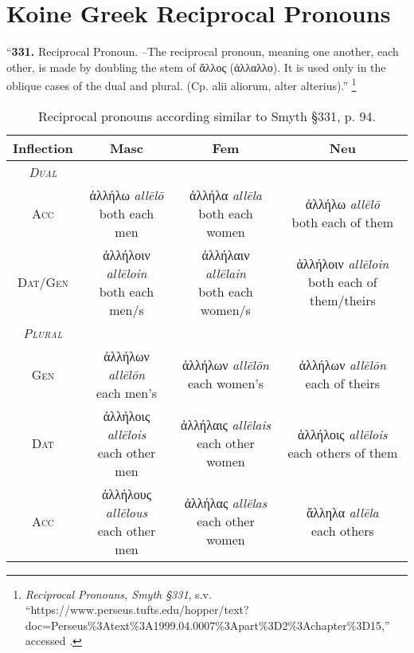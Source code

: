 \documentclass[10pt]{memoir}
\newcommand{\tsc}[1]{\textsc{#1}}
\newcommand{\grc}[1]{\fontspec{Inter}#1}
\newcommand{\trc}[1]{\textit{\fontspec{Tinos}#1}}
\newcommand{\linkfoot}[3]{\footnote{\emph{#1}, s.v. ``{#2},'' accessed \printdate{#3}.}}
\begin{document}
    \section*{Koine Greek Reciprocal Pronouns}

    ``\textbf{331.} Reciprocal Pronoun. --The reciprocal pronoun, meaning one another, each other, is made
    by doubling the stem of \grc{ἄλλος} (\grc{ἀλλαλλο}). \fontspec{} It is used only in the oblique cases of
    the dual and plural. (Cp. alii aliorum, alter alterius).''
    \linkfoot{Reciprocal Pronouns, Smyth §331}{https://www.perseus.tufts.edu/hopper/text?doc=Perseus\%3Atext\%3A1999.04.0007\%3Apart\%3D2\%3Achapter\%3D15}{2025-05-23}

    \begin{table}[H]
        \begin{tabular}{c|ccc}
            \textbf{Inflection} & \textbf{Masc} & \textbf{Fem} & \textbf{Neu} \\
            \hline
            \emph{\tsc{Dual}} \\
            \tsc{Acc} & \makecell{\grc{ἀλλήλω} \trc{allēlō} \\ \small both each men} & \makecell{\grc{ἀλλήλα} \trc{allēla} \\ \small both each women} & \makecell{\grc{ἀλλήλω} \trc{allēlō} \\ \small both each of them} \\
            \tsc{Dat/Gen} & \makecell{\grc{ἀλλήλοιν} \trc{allēloin} \\ \small both each men/s} & \makecell{\grc{ἀλλήλαιν} \trc{allēlain} \\ \small both each women/s} & \makecell{\grc{ἀλλήλοιν} \trc{allēloin} \\ \small both each of them/theirs} \\
            \hline
            \emph{\tsc{Plural}} \\
            \tsc{Gen} & \makecell{\grc{ἀλλήλων} \trc{allēlōn} \\ \small each men's} & \makecell{\grc{ἀλλήλων} \trc{allēlōn} \\ \small each women's} & \makecell{\grc{ἀλλήλων} \trc{allēlōn} \\ \small each of theirs} \\
            \tsc{Dat} & \makecell{\grc{ἀλλήλοις} \trc{allēlois} \\ \small each other men} & \makecell{\grc{ἀλλήλαις} \trc{allēlais}\\ \small each other women} & \makecell{\grc{ἀλλήλοις} \trc{allēlois} \\ \small each others of them } \\
            \tsc{Acc} & \makecell{\grc{ἀλλήλους} \trc{allēlous} \\ \small each other men} & \makecell{\grc{ἀλλήλας} \trc{allēlas} \\ \small each other women} & \makecell{\grc{ἄλληλα} \trc{allēla} \\ \small each others} \\
        \end{tabular}
        \caption{Reciprocal pronouns according similar to Smyth §331, p. 94.}
    \end{table}
\end{document}

